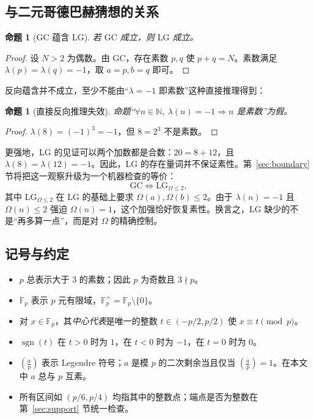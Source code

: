 \documentclass[11pt,a4paper]{ctexart}
\theoremstyle{plain}
\newtheorem{proposition}[theorem]{命题}
\theoremstyle{definition}
\newcommand{\Fp}{\mathbb{F}_p}
\newcommand{\Fpx}{\mathbb{F}_p^{\times}}
\newcommand{\N}{\mathbb{N}}
\newcommand{\li}{\lambda}
\newcommand{\Om}{\Omega}
\newcommand{\GC}{\mathrm{GC}}
\newcommand{\LG}{\mathrm{LG}}
\newcommand{\LGtwo}{\mathrm{LG}_{\Om\le2}}
\newcommand{\leg}[2]{\left(\frac{#1}{#2}\right)}
\newcommand{\sgn}{\operatorname{sgn}}
\begin{document}
\subsection{与二元哥德巴赫猜想的关系}
\label{sec:relation-preview}

\begin{proposition}[GC 蕴含 LG]
\label{prop:gc-implies-lg}
若 $\GC$ 成立，则 $\LG$ 成立。
\end{proposition}

\begin{proof}
设 $N>2$ 为偶数。由 $\GC$，存在素数 $p,q$ 使 $p+q=N$。素数满足 $\li(p)=\li(q)=-1$，取 $a=p,b=q$ 即可。
\end{proof}

反向蕴含并不成立，至少不能由“$\li=-1$ 即素数”这种直接推理得到：

\begin{proposition}[直接反向推理失效]
\label{prop:naive-converse}
命题“$\forall n\in\N,\ \li(n)=-1\Rightarrow n$ 是素数”为假。
\end{proposition}

\begin{proof}
$\li(8)=(-1)^3=-1$，但 $8=2^3$ 不是素数。
\end{proof}

更强地，LG 的见证可以两个加数都是合数：$20=8+12$，且 $\li(8)=\li(12)=-1$。因此，LG 的存在量词并不保证素性。第~\ref{sec:boundary} 节将把这一观察升级为一个机器检查的等价：
\begin{equation}
  \GC\iff\LGtwo,
  \label{eq:omega-equiv-preview}
\end{equation}
其中 $\LGtwo$ 在 LG 的基础上要求 $\Om(a),\Om(b)\le2$。由于 $\li(n)=-1$ 且 $\Om(n)\le2$ 强迫 $\Om(n)=1$，这个加强恰好恢复素性。换言之，LG 缺少的不是“再多算一点”，而是对 $\Om$ 的精确控制。

\subsection{记号与约定}
\label{sec:notation}

\begin{itemize}
\item $p$ 总表示大于 $3$ 的素数；因此 $p$ 为奇数且 $3\nmid p$。
\item $\Fp$ 表示 $p$ 元有限域，$\Fpx=\Fp\setminus\{0\}$。
\item 对 $x\in\Fp$，其\emph{中心代表}是唯一的整数 $t\in(-p/2,p/2)$ 使 $x\equiv t\pmod p$。
\item $\sgn(t)$ 在 $t>0$ 时为 $1$，在 $t<0$ 时为 $-1$，在 $t=0$ 时为 $0$。
\item $\leg{a}{p}$ 表示 Legendre 符号；$a$ 是模 $p$ 的二次剩余当且仅当 $\leg{a}{p}=1$。在本文中 $a$ 总与 $p$ 互素。
\item 所有区间如 $(p/6,p/4)$ 均指其中的整数点；端点是否为整数在第~\ref{sec:support} 节统一检查。
\end{itemize}
\end{document}

